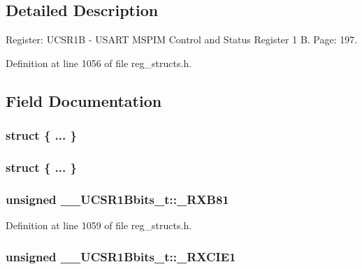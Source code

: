 \subsection{Detailed Description}
Register\+: U\+C\+S\+R1\+B -\/ U\+S\+A\+R\+T M\+S\+P\+I\+M Control and Status Register 1 B. Page\+: 197. 

Definition at line 1056 of file reg\+\_\+structs.\+h.



\subsection{Field Documentation}
\hypertarget{union_____u_c_s_r1_bbits__t_ac783ef39edea74bee13fe0edde24970b}{\subsubsection[{"@255}]{\setlength{\rightskip}{0pt plus 5cm}struct \{ ... \} }}\label{union_____u_c_s_r1_bbits__t_ac783ef39edea74bee13fe0edde24970b}
\hypertarget{union_____u_c_s_r1_bbits__t_a6d0a7fa65b685cfdcf940283861912c2}{\subsubsection[{"@257}]{\setlength{\rightskip}{0pt plus 5cm}struct \{ ... \} }}\label{union_____u_c_s_r1_bbits__t_a6d0a7fa65b685cfdcf940283861912c2}
\hypertarget{union_____u_c_s_r1_bbits__t_a528ee3920187cee1ed4258d9eee0ed59}{
\subsubsection[{\+\_\+\+R\+X\+B81}]{\setlength{\rightskip}{0pt plus 5cm}unsigned \+\_\+\+\_\+\+U\+C\+S\+R1\+Bbits\+\_\+t\+::\+\_\+\+R\+X\+B81}}\label{union_____u_c_s_r1_bbits__t_a528ee3920187cee1ed4258d9eee0ed59}


Definition at line 1059 of file reg\+\_\+structs.\+h.

\hypertarget{union_____u_c_s_r1_bbits__t_a9dec2efc7e028b5afcb77672353b1937}{
\subsubsection[{\+\_\+\+R\+X\+C\+I\+E1}]{\setlength{\rightskip}{0pt plus 5cm}unsigned \+\_\+\+\_\+\+U\+C\+S\+R1\+Bbits\+\_\+t\+::\+\_\+\+R\+X\+C\+I\+E1}}\label{union_____u_c_s_r1_bbits__t_a9dec2efc7e028b5afcb77672353b1937}


